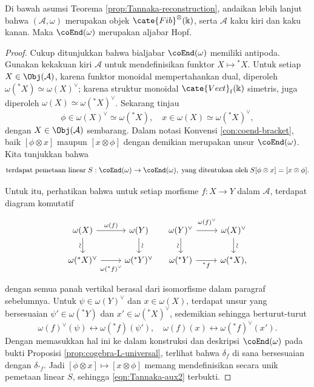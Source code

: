 \begin{theorem}\label{prop:Tannaka-aux2}
	Di bawah asumsi Teorema \ref{prop:Tannaka-reconstruction}, andaikan lebih
	lanjut bahwa $(\mathcal{A}, \omega)$ merupakan objek
	$\cate{Fib}^{\otimes}(\Bbbk)$, serta $\mathcal{A}$ kaku kiri dan kaku
	kanan. Maka $\coEnd(\omega)$ merupakan aljabar Hopf.
\end{theorem}
\begin{proof}
	Cukup ditunjukkan bahwa bialjabar $\coEnd(\omega)$ memiliki antipoda.
	Gunakan kekakuan kiri $\mathcal{A}$ untuk mendefinisikan funktor
	$X \mapsto {}^* X$. Untuk setiap $X \in \Obj(\mathcal{A})$, karena
	funktor monoidal mempertahankan dual, diperoleh
	$\omega({}^* X) \simeq \omega(X)^\vee$; karena struktur monoidal
	$\cate{Vect}_{\mathrm{f}}(\Bbbk)$ simetris, juga diperoleh
	$\omega(X) \simeq \omega({}^* X)^\vee$. Sekarang tinjau
	\[ \phi \in \omega(X)^\vee \simeq \omega({}^* X), \quad x \in \omega(X) \simeq \omega({}^* X)^\vee , \]
	dengan $X \in \Obj(\mathcal{A})$ sembarang. Dalam notasi Konvensi
	\ref{con:coend-bracket}, baik $[\phi \otimes x]$ maupun
	$[x \otimes \phi]$ dengan demikian merupakan unsur $\coEnd(\omega)$.
	Kita tunjukkan bahwa
	\begin{equation}\label{eqn:Tannaka-aux2}
		\text{terdapat pemetaan linear}\; S: \coEnd(\omega) \to \coEnd(\omega), \;\text{yang ditentukan oleh}\; S[\phi \otimes x] = [x \otimes \phi]. 
	\end{equation}

	Untuk itu, perhatikan bahwa untuk setiap morfisme $f: X \to Y$ dalam
	$\mathcal{A}$, terdapat diagram komutatif
	\[\begin{tikzcd}
		\omega(X) \arrow[r, "{\omega(f)}"] \arrow[d, "\sim"' sloped] & \omega(Y) \arrow[d, "\sim" sloped] \\
		\omega({}^* X)^\vee \arrow[r, "{\omega({}^* f)^\vee}"' inner sep=0.6em] & \omega({}^* Y)^\vee
	\end{tikzcd} \quad \begin{tikzcd}
		\omega(Y)^\vee \arrow[r, "{\omega(f)^\vee}" inner sep=0.6em] \arrow[d, "\sim"' sloped] & \omega(X)^\vee \arrow[d, "\sim" sloped] \\
		\omega({}^* Y) \arrow[r, "{{}^* f}"'] & \omega({}^* X),
	\end{tikzcd}\]
	dengan semua panah vertikal berasal dari isomorfisme dalam paragraf
	sebelumnya. Untuk $\psi \in \omega(Y)^\vee$ dan
	$x \in \omega(X)$, terdapat unsur yang bersesuaian
	$\psi' \in \omega({}^* Y)$ dan $x' \in \omega({}^* X)^\vee$, sedemikian sehingga berturut-turut
	\[ \omega(f)^\vee (\psi) \leftrightarrow \omega({}^* f)(\psi'), \quad \omega(f)(x) \leftrightarrow \omega({}^* f)^\vee(x'). \]
	Dengan memasukkan hal ini ke dalam konstruksi dan deskripsi
	$\coEnd(\omega)$ pada bukti Proposisi
	\ref{prop:cogebra-L-universal}, terlihat bahwa $\delta_f$ di sana
	bersesuaian dengan $\delta_{{}^* f}$. Jadi
	$[\phi \otimes x] \mapsto [x \otimes \phi]$ memang mendefinisikan secara
	unik pemetaan linear $S$, sehingga \eqref{eqn:Tannaka-aux2}
	terbukti.
	

\end{proof}
